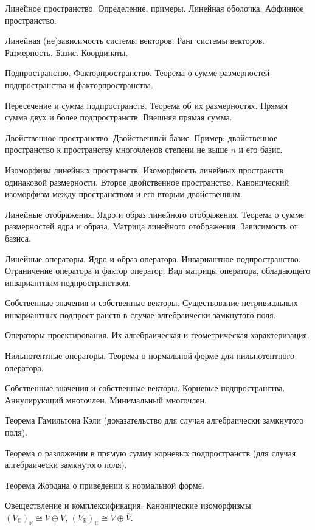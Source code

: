 \documentclass[a4paper]{article}
\begin{document}
\begin{nums}{-2}
\item Линейное пространство. Определение, примеры. Линейная
оболочка. Аффинное пространство.
\item  Линейная  (не)зависимость системы векторов. Ранг  системы
векторов.  Размерность.  Базис. Координаты.
\item Подпространство. Факторпространство.   Теорема о сумме
размерностей подпространства и факторпространства.
\item Пересечение и сумма подпространств. Теорема об их размерностях.
Прямая сумма двух и более подпространств. Внешняя прямая сумма.
\item Двойственное пространство.   Двойственный базис.   Пример:
двойственное пространство   к пространству многочленов степени не
выше $n$ и его базис.
\item  Изоморфизм линейных   пространств. Изоморфность линейных
пространств одинаковой размерности. Второе двойственное
пространство. Канонический изоморфизм между пространством и его
вторым двойственным.
\item Линейные отображения. Ядро и образ линейного отображения.
Теорема о сумме размерностей ядра и образа. Матрица линейного
отображения. Зависимость от базиса.
\item Линейные операторы. Ядро и образ оператора. Инвариантное
подпространство. Ограничение оператора   и фактор оператор.    Вид
матрицы оператора, обладающего инвариантным подпространством.
\item Собственные значения и собственные векторы. Существование
нетривиальных инвариантных подпрост-\break ранств в случае
алгебраически замкнутого поля.
\item Операторы проектирования. Их алгебраическая и геометрическая
характеризация.
\item  Нильпотентные операторы. Теорема о нормальной форме для
нильпотентного оператора.
\item Собственные значения и собственные векторы. Корневые
подпространства. Аннулирующий многочлен. Минимальный многочлен.
\item  Теорема Гамильтона Кэли (доказательство для случая
алгебраически замкнутого поля).
\item Теорема о разложении в прямую сумму корневых подпространств
(для случая алгебраически замкнутого поля).
\item  Теорема Жордана о приведении к нормальной форме.
\item Овеществление и комплексификация. Канонические изоморфизмы
$(V_\mathbb{C})_\mathbb{R}\cong V\oplus V$,
$(V_\mathbb{R})_\mathbb{C}\cong V\oplus \overline{V}$.


\end{nums}
\end{document}
